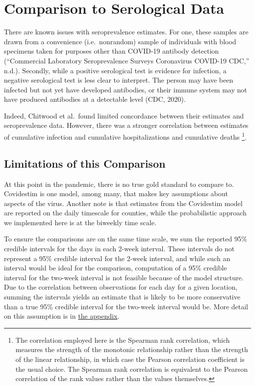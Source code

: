 \documentclass[12pt,twoside]{smiththesis}
\begin{document}
\hypertarget{comparison-to-serological-data}{%
\section{Comparison to Serological Data}\label{comparison-to-serological-data}}

There are known issues with seroprevalence estimates. For one, these samples are drawn from a convenience (i.e.~nonrandom) sample of individuals with blood specimens taken for purposes other than COVID-19 antibody detection ({``Commercial {Laboratory Seroprevalence Surveys} \textbar{} {Coronavirus} \textbar{} {COVID-19} \textbar{} {CDC},''} n.d.). Secondly, while a positive serological test is evidence for infection, a negative serological test is less clear to interpret. The person may have been infected but not yet have developed antibodies, or their immune system may not have produced antibodies at a detectable level (CDC, 2020).

Indeed, Chitwood et al.~found limited concordance between their estimates and seroprevalence data. However, there was a stronger correlation between estimates of cumulative infection and cumulative hospitalizations and cumulative deaths \footnote{The correlation employed here is the Spearman rank correlation, which measures the strength of the monotonic relationship rather than the strength of the linear relationship, in which case the Pearson correlation coefficient is the usual choice. The Spearman rank correlation is equivalent to the Pearson correlation of the rank values rather than the values themselves. }.

\hypertarget{lims}{%
\subsection{Limitations of this Comparison}\label{lims}}

At this point in the pandemic, there is no true gold standard to compare to. Covidestim is one model, among many, that makes key assumptions about aspects of the virus. Another note is that estimates from the Covidestim model are reported on the daily timescale for counties, while the probabilistic approach we implemented here is at the biweekly time scale.

To ensure the comparisons are on the same time scale, we sum the reported 95\% credible intervals for the days in each 2-week interval. These intervals do not represent a 95\% credible interval for the 2-week interval, and while such an interval would be ideal for the comparison, computation of a 95\% credible interval for the two-week interval is not feasible because of the model structure. Due to the correlation between observations for each day for a given location, summing the intervals yields an estimate that is likely to be more conservative than a true 95\% credible interval for the two-week interval would be. More detail on this assumption is in \protect\hyperlink{conservativeintervals}{the appendix}.
\end{document}
